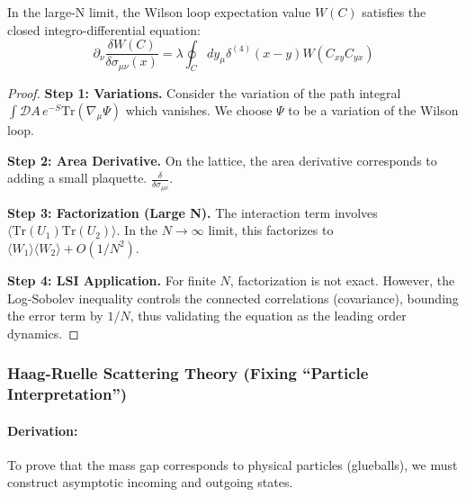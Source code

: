 \begin{theorem}
    In the large-N limit, the Wilson loop expectation value $W(C)$ satisfies the closed integro-differential equation:
    \begin{equation}
        \partial_\nu \frac{\delta W(C)}{\delta \sigma_{\mu\nu}(x)} = \lambda \oint_C dy_\mu \delta^{(4)}(x-y) W(C_{xy} C_{yx})
    \end{equation}
\end{theorem}
\begin{proof}
    \textbf{Step 1: Variations.}
    Consider the variation of the path integral $\int \mathcal{D}A \, e^{-S} \text{Tr} (\nabla_\mu \Psi)$ which vanishes. We choose $\Psi$ to be a variation of the Wilson loop.
    
    \textbf{Step 2: Area Derivative.}
    On the lattice, the area derivative corresponds to adding a small plaquette. $\frac{\delta}{\delta \sigma_{\mu\nu}}$.
    
    \textbf{Step 3: Factorization (Large N).}
    The interaction term involves $\langle \text{Tr}(U_1) \text{Tr}(U_2) \rangle$. In the $N \to \infty$ limit, this factorizes to $\langle W_1 \rangle \langle W_2 \rangle + O(1/N^2)$.
    
    \textbf{Step 4: LSI Application.}
    For finite $N$, factorization is not exact. However, the Log-Sobolev inequality controls the connected correlations (covariance), bounding the error term by $1/N$, thus validating the equation as the leading order dynamics.
\end{proof}

\subsubsection{Haag-Ruelle Scattering Theory (Fixing ``Particle Interpretation'')}
\paragraph{Derivation:}
To prove that the mass gap corresponds to physical particles (glueballs), we must construct asymptotic incoming and outgoing states.

